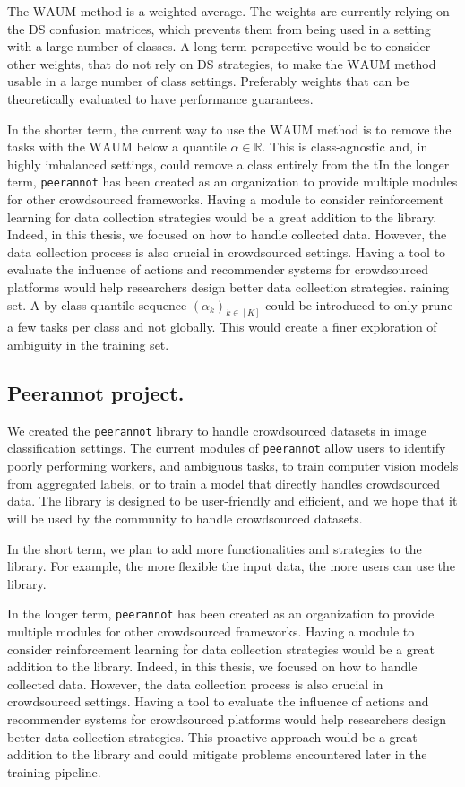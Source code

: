 The $\mathrm{WAUM}$ method is a weighted average.
The weights are currently relying on the DS confusion matrices, which prevents them from being used in a setting with a large number of classes.
A long-term perspective would be to consider other weights, that do not rely on DS strategies, to make the $\mathrm{WAUM}$ method usable in a large number of class settings.
Preferably weights that can be theoretically evaluated to have performance guarantees.

In the shorter term, the current way to use the $\mathrm{WAUM}$ method is to remove the tasks with the $\mathrm{WAUM}$ below a quantile $\alpha\in\mathbb{R}$.
This is class-agnostic and, in highly imbalanced settings, could remove a class entirely from the tIn the longer term, \texttt{peerannot} has been created as an organization to provide multiple modules for other crowdsourced frameworks.
Having a module to consider reinforcement learning for data collection strategies would be a great addition to the library.
Indeed, in this thesis, we focused on how to handle collected data.
However, the data collection process is also crucial in crowdsourced settings.
Having a tool to evaluate the influence of actions and recommender systems for crowdsourced platforms would help researchers design better data collection strategies.
raining set.
A by-class quantile sequence $(\alpha_k)_{k\in [K]}$ could be introduced to only prune a few tasks per class and not globally.
This would create a finer exploration of ambiguity in the training set.

\subsection{Peerannot project.}

We created the \texttt{peerannot} library to handle crowdsourced datasets in image classification settings.
The current modules of \texttt{peerannot} allow users to identify poorly performing workers, and ambiguous tasks, to train computer vision models from aggregated labels, or to train a model that directly handles crowdsourced data.
The library is designed to be user-friendly and efficient, and we hope that it will be used by the community to handle crowdsourced datasets.

In the short term, we plan to add more functionalities and strategies to the library.
For example, the more flexible the input data, the more users can use the library.

In the longer term, \texttt{peerannot} has been created as an organization to provide multiple modules for other crowdsourced frameworks.
Having a module to consider reinforcement learning for data collection strategies would be a great addition to the library.
Indeed, in this thesis, we focused on how to handle collected data.
However, the data collection process is also crucial in crowdsourced settings.
Having a tool to evaluate the influence of actions and recommender systems for crowdsourced platforms would help researchers design better data collection strategies.
This proactive approach would be a great addition to the library and could mitigate problems encountered later in the training pipeline.

